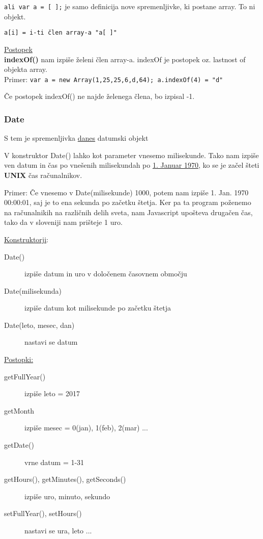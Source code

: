 \texttt{ali var a = [ ];} je samo definicija nove spremenljivke, ki postane array. To ni objekt.

\texttt{a[i] = i-ti člen array-a "a[ ]"}

\underline{Postopek}\\
\textbf{indexOf()} nam izpiše želeni člen array-a. indexOf je postopek oz. lastnost of objekta array.\\
Primer:
\texttt{var a = new Array(1,25,25,6,d,64); a.indexOf(4) = "d"}

Če postopek indexOf() ne najde želenega člena, bo izpisal -1.

\subsubsection*{Date}

{\centering{}\par} S tem je spremenljivka \underline{danes} datumski objekt

V konstruktor Date() lahko kot parameter vnesemo milisekunde. Tako nam izpiše ven datum in čas po vnešenih milisekundah po \underline{1. Januar 1970}, ko se je začel šteti \textbf{UNIX} čas računalnikov.

Primer: Če vnesemo v Date(milisekunde) 1000, potem nam izpiše 1. Jan. 1970 00:00:01, saj je to ena sekunda po začetku štetja. Ker pa ta program poženemo na računalnikih na različnih delih sveta, nam Javascript upošteva drugačen čas, tako da v sloveniji nam prišteje 1 uro.

\underline{Konstruktorji}:
\begin{description}
	\item[Date()] izpiše datum in uro v določenem časovnem območju
	\item[Date(milisekunda)] izpiše datum kot milisekunde po začetku štetja 
	\item[Date(leto, mesec, dan)] nastavi se datum
\end{description}
\newpage
\underline{Postopki:}
\begin{description}
	\item[getFullYear()] izpiše leto = 2017
	\item[getMonth] izpiše mesec = 0(jan), 1(feb), 2(mar) ...
	\item[getDate()] vrne datum = 1-31
	\item[getHours(), getMinutes(), getSeconds()] izpiše uro, minuto, sekundo
	\item[setFullYear(), setHours()] nastavi se ura, leto ...
\end{description}

